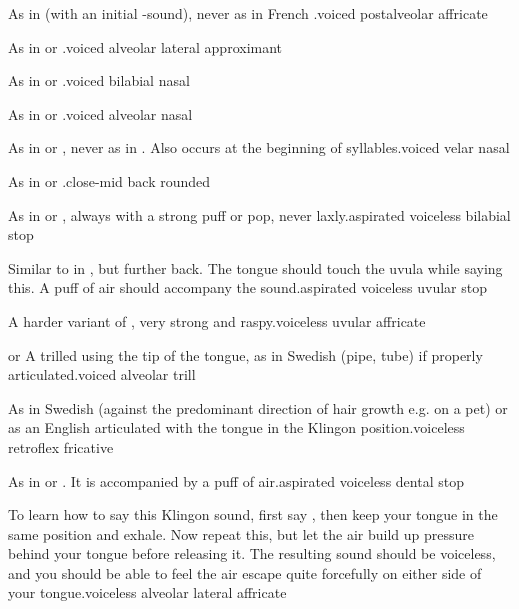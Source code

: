 %
  {\textipa{[\t{dZ}]} As in  (with an initial
  -sound), never as in French .}{voiced postalveolar
  affricate}

%
  {\textipa{[l]} As in  or .}{voiced
  alveolar lateral approximant}

%
  {\textipa{[m]} As in  or .}{voiced
  bilabial nasal}

%
  {\textipa{[n]} As in  or .}{voiced
  alveolar nasal}

%
  {\textipa{[N]} As in  or , never as in
  . Also occurs at the beginning of syllables.}{voiced
  velar nasal}

%
  {\textipa{[o]} As in  or .}{close-mid back
  rounded}

%
  {\textipa{[p\super h]} As in  or ,
  always with a strong puff or pop, never laxly.}{aspirated voiceless
  bilabial stop}

%
  {\textipa{[q\super h]} Similar to  in , but further
  back. The tongue should touch the uvula while saying this. A puff of
  air should accompany the sound.}{aspirated voiceless uvular stop}

%
  {\textipa{[\t{qX}]} A harder variant of , very strong and
  raspy.}{voiceless uvular affricate}

%
  {\textipa{[r]} or \textipa{[\*r]} A trilled  using the tip of
  the tongue, as in Swedish  (pipe, tube) if properly
  articulated.}{voiced alveolar trill}


%
  {\textipa{[\:s]} As in Swedish  (against the
  predominant direction of hair growth e.g. on a pet) or as an English
   articulated with the tongue in the Klingon 
  position.}{voiceless retroflex fricative}

%
  {\textipa{[t\super h]} As in  or
  . It is accompanied by a puff of air.}{aspirated
  voiceless dental stop}

%
  {\textipa{[\t{t\textbeltl}]} To learn how to say this Klingon sound,
  first say , then keep your tongue in the same position and
  exhale. Now repeat this, but let the air build up pressure behind
  your tongue before releasing it. The resulting sound should be
  voiceless, and you should be able to feel the air escape quite
  forcefully on either side of your tongue.}{voiceless alveolar
  lateral affricate}

